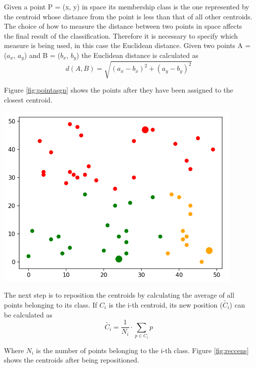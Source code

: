 \documentclass{report}
\begin{document}
\begin{minipage}[b]{0.48\textwidth}
  Given a point P = (x, y) in space its membership class is the one represented by the centroid whose distance from the point is less than that of all other centroids. The choice of how to measure the distance between two points in space affects the final result of the classification. Therefore it is necessary to specify which measure is being used, in this case the Euclidean distance. Given two points A = ($a_x$, $a_y$) and B = ($b_x$, $b_y$) the Euclidean distance is calculated as
  \begin{equation}
      d(A, B) = \sqrt{(a_x - b_x)^2 + (a_y - b_y)^2}
  \end{equation}

  Figure \ref{fig:pointasgn} shows the points after they have been assigned to the closest centroid.

  \begin{center}    
      \includegraphics[width = 0.9\textwidth]{imgs/asgnpoints.png}
      \label{fig:pointasgn}
  \end{center}

  The next step is to reposition the centroids by calculating the average of all points belonging to its class. If $C_i$ is the i-th centroid, its new position ($\tilde{C_i}$) can be calculated as
  \begin{equation}
      \tilde{C_i} = \frac{1}{N_i}\cdot \sum_{p \in C_i} p
      \label{eq:centrep}
  \end{equation}

  Where $N_i$ is the number of points belonging to the i-th class.
  Figure \ref{fig:reccens} shows the centroids after being repositioned. 
  

\end{minipage}
\end{document}
